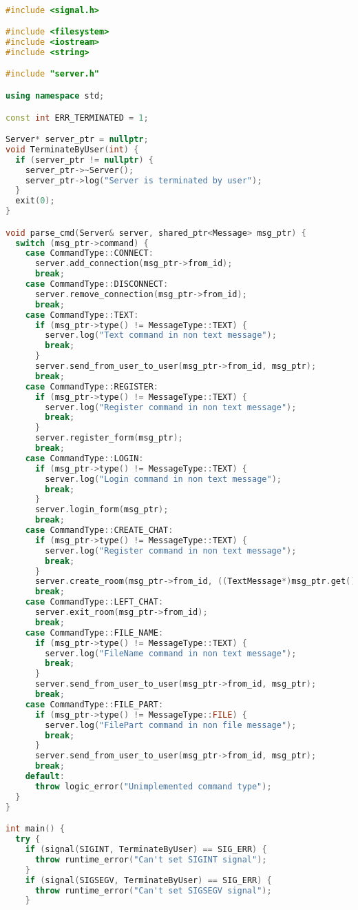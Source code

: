 \begin{lstlisting}[language=C++]

#include <signal.h>

#include <filesystem>
#include <iostream>
#include <string>

#include "server.h"

using namespace std;

const int ERR_TERMINATED = 1;

Server* server_ptr = nullptr;
void TerminateByUser(int) {
  if (server_ptr != nullptr) {
    server_ptr->~Server();
    server_ptr->log("Server is terminated by user");
  }
  exit(0);
}

void parse_cmd(Server& server, shared_ptr<Message> msg_ptr) {
  switch (msg_ptr->command) {
    case CommandType::CONNECT:
      server.add_connection(msg_ptr->from_id);
      break;
    case CommandType::DISCONNECT:
      server.remove_connection(msg_ptr->from_id);
      break;
    case CommandType::TEXT:
      if (msg_ptr->type() != MessageType::TEXT) {
        server.log("Text command in non text message");
        break;
      }
      server.send_from_user_to_user(msg_ptr->from_id, msg_ptr);
      break;
    case CommandType::REGISTER:
      if (msg_ptr->type() != MessageType::TEXT) {
        server.log("Register command in non text message");
        break;
      }
      server.register_form(msg_ptr);
      break;
    case CommandType::LOGIN:
      if (msg_ptr->type() != MessageType::TEXT) {
        server.log("Login command in non text message");
        break;
      }
      server.login_form(msg_ptr);
      break;
    case CommandType::CREATE_CHAT:
      if (msg_ptr->type() != MessageType::TEXT) {
        server.log("Register command in non text message");
        break;
      }
      server.create_room(msg_ptr->from_id, ((TextMessage*)msg_ptr.get())->text);
      break;
    case CommandType::LEFT_CHAT:
      server.exit_room(msg_ptr->from_id);
      break;
    case CommandType::FILE_NAME:
      if (msg_ptr->type() != MessageType::TEXT) {
        server.log("FileName command in non text message");
        break;
      }
      server.send_from_user_to_user(msg_ptr->from_id, msg_ptr);
      break;
    case CommandType::FILE_PART:
      if (msg_ptr->type() != MessageType::FILE) {
        server.log("FilePart command in non file message");
        break;
      }
      server.send_from_user_to_user(msg_ptr->from_id, msg_ptr);
      break;
    default:
      throw logic_error("Unimplemented command type");
  }
}

int main() {
  try {
    if (signal(SIGINT, TerminateByUser) == SIG_ERR) {
      throw runtime_error("Can't set SIGINT signal");
    }
    if (signal(SIGSEGV, TerminateByUser) == SIG_ERR) {
      throw runtime_error("Can't set SIGSEGV signal");
    }


\end{lstlisting}
